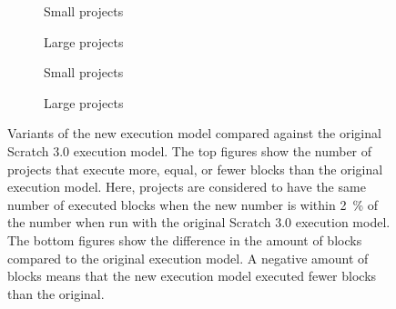 \documentclass[../main]{subfiles}
\begin{document}
\begin{figure}
    \begin{wide}
        \begin{subfigure}{\linewidth}
            \centering
            
        \end{subfigure}
        \begin{subfigure}{0.49\linewidth}
            
            \caption{Small projects}
            \label{fig:blocks-non-interactive-small}
        \end{subfigure}
        \begin{subfigure}{0.49\linewidth}
            
            \caption{Large projects}
            \label{fig:blocks-non-interactive-large}
        \end{subfigure}
        \vspace*{\floatsep}
        \begin{subfigure}{0.49\linewidth}
            
            \caption{Small projects}
            \label{fig:blocks-non-interactive-violin-small}
        \end{subfigure}
        \begin{subfigure}{0.49\linewidth}
            
            \caption{Large projects}
            \label{fig:blocks-non-interactive-violin-large}
        \end{subfigure}
    \end{wide}
    \caption{
        Variants of the new execution model compared against the original Scratch 3.0 execution model.
        The top figures show the number of projects that execute more, equal, or fewer blocks than the original execution model.
        Here, projects are considered to have the same number of executed blocks when the new number is within \qty{2}{\percent} of the number when run with the original Scratch 3.0 execution model.
        The bottom figures show the difference in the amount of blocks compared to the original execution model.
        A negative amount of blocks means that the new execution model executed fewer blocks than the original.
    }
    \label{fig:blocks-non-interactive}
\end{figure}
\end{document}
